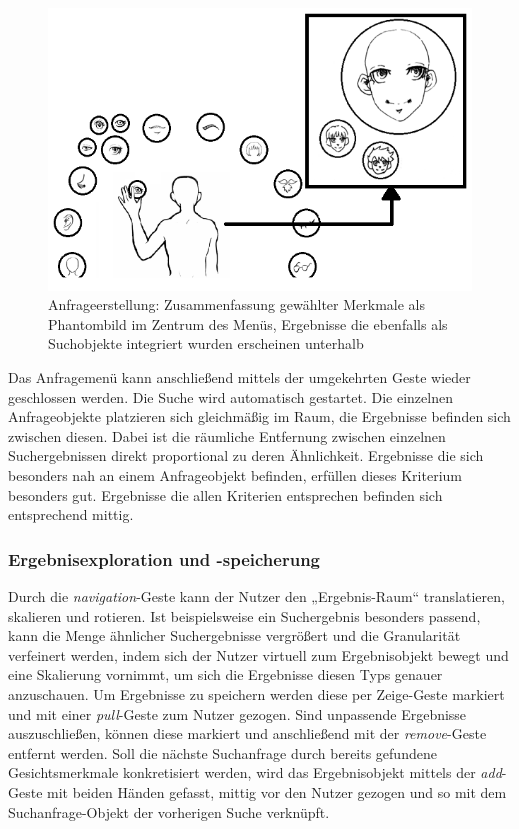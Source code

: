 \documentclass{sigchi-ext}
\begin{document}
\begin{figure}
  \centering
  \includegraphics[width=1.5\marginparwidth]{figures/query_menu.png}
  \caption{Anfrageerstellung: Zusammenfassung gewählter Merkmale als Phantombild im Zentrum des Menüs, Ergebnisse die ebenfalls als Suchobjekte integriert wurden erscheinen unterhalb}
  \label{fig:querymenu}
\end{figure}

Das Anfragemenü kann anschließend mittels der umgekehrten Geste wieder
geschlossen werden. Die Suche wird automatisch gestartet. Die
einzelnen Anfrageobjekte platzieren sich gleichmäßig im Raum, die
Ergebnisse befinden sich zwischen diesen. Dabei ist die räumliche
Entfernung zwischen einzelnen Suchergebnissen direkt proportional zu
deren Ähnlichkeit. Ergebnisse die sich besonders nah an einem
Anfrageobjekt befinden, erfüllen dieses Kriterium besonders gut. Ergebnisse die allen Kriterien entsprechen befinden sich entsprechend mittig.

\subsubsection{Ergebnisexploration und -speicherung}
Durch die \textit{navigation}-Geste kann der Nutzer den „Ergebnis-Raum“
translatieren, skalieren und rotieren. Ist beispielsweise ein Suchergebnis besonders
passend, kann die Menge ähnlicher Suchergebnisse vergrößert und die
Granularität verfeinert werden, indem sich der Nutzer virtuell zum Ergebnisobjekt bewegt und eine Skalierung vornimmt, um sich die Ergebnisse diesen Typs genauer anzuschauen.
Um Ergebnisse zu speichern werden diese per Zeige-Geste markiert und mit einer \textit{pull}-Geste zum Nutzer gezogen. Sind unpassende Ergebnisse auszuschließen, können diese markiert und anschließend mit der \textit{remove}-Geste entfernt werden.
Soll die nächste Suchanfrage durch bereits gefundene Gesichtsmerkmale konkretisiert werden, wird das Ergebnisobjekt mittels der \textit{add}-Geste mit beiden Händen gefasst, mittig vor den Nutzer gezogen und so mit dem Suchanfrage-Objekt der vorherigen Suche verknüpft.
\end{document}
